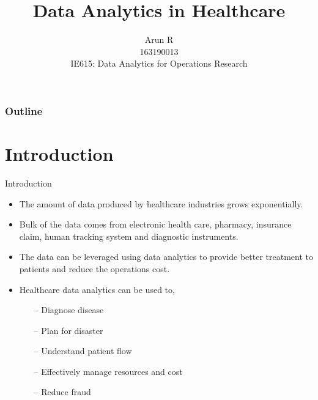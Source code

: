 \documentclass[xcolor=dvipsnames]{beamer}
\title[Data Analytics in Healthcare]{Data Analytics in Healthcare}
\author[IEOR, IITB]{Arun R \\163190013 \\ \bigskip IE615: Data Analytics for Operations Research}
\begin{document}

\begin{frame}
\titlepage
\end{frame}

\begin{frame}
	\frametitle{Outline}
	\tableofcontents
\end{frame}

\section{Introduction}
\begin{frame}{Introduction}
\begin{itemize}
\item The amount of data produced by healthcare industries grows exponentially. 
\item Bulk of the data comes from electronic health care, pharmacy, insurance claim, human tracking system and diagnostic instruments. 
\item The data can be leveraged using data analytics to provide better treatment to patients and reduce the operations cost. 
\item Healthcare data analytics can be used to,
\begin{itemize}
\item[--] \alert{Diagnose disease}
\item[--] Plan for disaster
\item[--] Understand patient flow
\item[--] Effectively manage resources and cost
\item[--] Reduce fraud  
\end{itemize} 
\end{itemize}
\end{frame}
\end{document}
